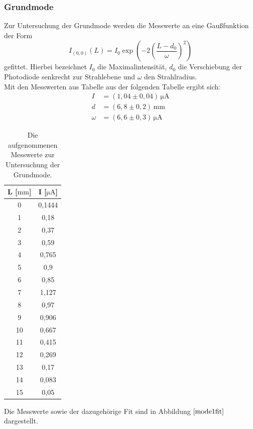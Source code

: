 \subsubsection{Grundmode}
Zur Untersuchung der Grundmode werden die Messwerte an eine Gaußfunktion der Form
\begin{equation}
\label{eqn:gauß}
  I_{(0, 0)}(L) = I_0\exp\left(-2\left(\frac{L - d_0}{\omega}\right)^2\right)
\end{equation}
gefittet. Hierbei bezeichnet $I_0$ die Maximalintensität, $d_0$ die Verschiebung der Photodiode senkrecht zur Strahlebene und $\omega$ den Strahlradius.\\
Mit den Messwerten aus Tabelle aus der folgenden Tabelle ergibt sich:
\begin{align*}
  I &=(1,04 \pm 0,04)\, \si{\micro\ampere}\\
  d &=(6,8 \pm 0,2)\, \si{\milli\meter}   \\
 \omega &=(6,6 \pm 0,3)\,  \si{\micro\ampere}
\end{align*}
\begin{table}
\centering
\begin{tabular}{c|c}
L [$ \si{\milli\meter}$]   &   I [$ \si{\micro\ampere}$]     \\
\hline
0  & 0,1444 \\
1  & 0,18   \\
2  & 0,37   \\
3  & 0,59   \\
4  & 0,765  \\
5  & 0,9    \\
6  & 0,85   \\
7  & 1,127  \\
8  & 0,97   \\
9  & 0,906  \\
10 & 0,667  \\
11 & 0,415  \\
12 & 0,269  \\
13 & 0,17   \\
14 & 0,083  \\
15 & 0,05
\end{tabular}
\caption{Die aufgenommenen Messwerte zur Untersuchung der Grundmode.}
\label{mode1}
\end{table}
Die Messwerte sowie der dazugehörige Fit sind in Abbildung $\ref{mode1fit}$ dargestellt.
